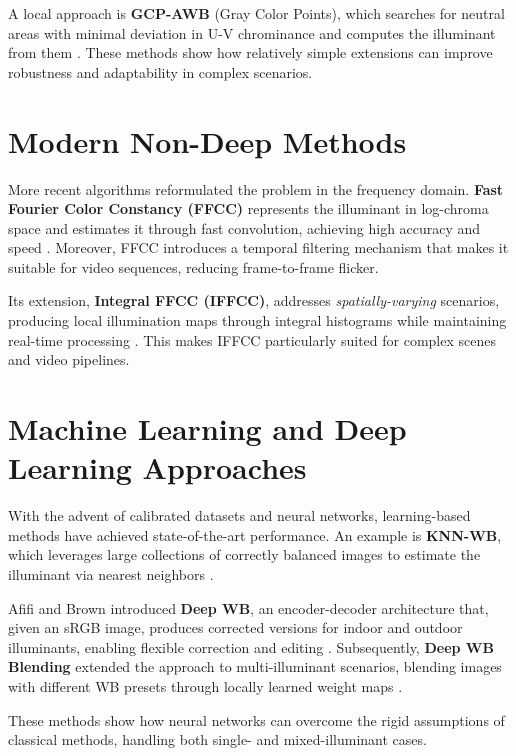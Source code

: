 A local approach is \textbf{GCP-AWB} (Gray Color Points), which searches for neutral areas with minimal deviation in U-V chrominance and computes the illuminant from them \cite{huo_robust_2006}. These methods show how relatively simple extensions can improve robustness and adaptability in complex scenarios.

\section{Modern Non-Deep Methods}

More recent algorithms reformulated the problem in the frequency domain. \textbf{Fast Fourier Color Constancy (FFCC)} represents the illuminant in log-chroma space and estimates it through fast convolution, achieving high accuracy and speed \cite{barron_fast_2017}. Moreover, FFCC introduces a temporal filtering mechanism that makes it suitable for video sequences, reducing frame-to-frame flicker.

Its extension, \textbf{Integral FFCC (IFFCC)}, addresses \textit{spatially-varying} scenarios, producing local illumination maps through integral histograms while maintaining real-time processing \cite{wei_integral_2025}. This makes IFFCC particularly suited for complex scenes and video pipelines.

\section{Machine Learning and Deep Learning Approaches}

With the advent of calibrated datasets and neural networks, learning-based methods have achieved state-of-the-art performance. An example is \textbf{KNN-WB}, which leverages large collections of correctly balanced images to estimate the illuminant via nearest neighbors \cite{afifi_deep_2020}. 

Afifi and Brown introduced \textbf{Deep WB}, an encoder-decoder architecture that, given an sRGB image, produces corrected versions for indoor and outdoor illuminants, enabling flexible correction and editing \cite{afifi_deep_2020}. Subsequently, \textbf{Deep WB Blending} extended the approach to multi-illuminant scenarios, blending images with different WB presets through locally learned weight maps \cite{afifi_auto_2022}.

These methods show how neural networks can overcome the rigid assumptions of classical methods, handling both single- and mixed-illuminant cases.


